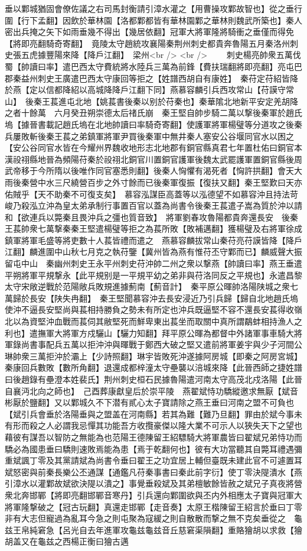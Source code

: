 垂以鄴城猶固會僚佐議之右司馬封衡請引漳水灌之【用曹操攻鄴故智也】從之垂行圍【行下孟翻】因飲於華林園【洛都鄴都皆有華林園鄴之華林則魏武所築也】秦人密出兵掩之矢下如雨垂幾不得出【幾居依翻】冠軍大將軍隆將騎衝之垂僅而得免【將即亮翻騎奇寄翻】　竟陵太守趙統攻襄陽秦荆州刺史都貴奔魯陽五月秦洛州刺史張五虎據豐陽來降【降戶江翻】　梁州<br />
<br />
　　刺史楊亮帥衆五萬伐蜀【帥讀曰率】遣巴西太守費統將水陸兵三萬為前鋒【費扶瑞翻將即亮翻】亮屯巴郡秦益州刺史王廣遣巴西太守康回等拒之【姓譜西胡自有康姓】　秦苻定苻紹皆降於燕【定以信都降紹以高城降降戶江翻下同】燕慕容麟引兵西攻常山【苻謨守常山】　後秦王萇進屯北地【姚萇書後秦以别於苻秦也】秦華隂北地新平安定羌胡降之者十餘萬　六月癸丑朔崇德太后禇氏崩　秦王堅自帥步騎二萬以撃後秦軍於趙氏塢【據晉書載記趙氏塢在北地帥讀曰率騎奇寄翻】使護軍將軍楊璧等分道攻之後秦兵屢敗斬後秦王萇之弟鎮軍將軍尹買後秦軍中無井秦人塞安公谷堰同官水以困之【安公谷同官水皆在今耀州界魏收地形志北地郡有銅官縣真君七年置杜佑曰銅官本漢祋祤縣地晉為頻陽苻秦於祋祤北銅官川置銅官護軍後魏太武罷護軍置銅官縣後周武帝移于今所隋以後唯作同官塞悉則翻】後秦人恟懼有渴死者【恟許拱翻】會天大雨後秦營中水三尺繞營百步之外寸餘而已後秦軍復振【復扶又翻】秦王堅歎曰天亦佑賊乎【天不助秦不可復支矣】　慕容泓謀臣高蓋等以泓德望不如慕容沖且持法苛峻乃殺泓立沖為皇太弟承制行事置百官以蓋為尚書令後秦王萇遣子嵩為質於沖以請和【欲連兵以斃秦且畏沖兵之彊也質音致】　將軍劉春攻魯陽都貴奔還長安　後秦王萇帥衆七萬撃秦秦王堅遣楊璧等拒之為萇所敗【敗補邁翻】獲楊璧及右將軍徐成鎮軍將軍毛盛等將吏數十人萇皆禮而遣之　燕慕容麟拔常山秦苻亮苻謨皆降【降戶江翻】麟進圍中山秋七月克之執苻鑒【冀州皆為燕有惟苻丕守鄴而已】麟威聲大振留屯中山　秦幽州刺史王永平州刺史苻沖帥二州之衆以撃燕【帥讀曰率】燕王垂遣平朔將軍平規撃永【此平規别是一平規平幼之弟非與苻洛同反之平規也】永遣昌黎太守宋敞逆戰於范陽敞兵敗規進據薊南【薊音計】　秦平原公暉帥洛陽陕城之衆七萬歸於長安【陕失冉翻】　秦王堅聞慕容沖去長安浸近乃引兵歸【歸自北地趙氏塢使沖不逼長安堅尚與萇相持勝負之勢未有所定也沖兵既逼堅不容不還長安萇得收嶺北以為資堅沖血戰而萇伺其敝堅死而鮮卑東出萇坐而取關中真所謂鷸蚌相持漁人之利也】遣撫軍大將軍方戍驪山【驪力知翻】拜平原公暉為都督中外諸軍事車騎大將軍錄尚書事配兵五萬以拒沖沖與暉戰于鄭西大破之堅又遣前將軍姜宇與少子河間公琳帥衆三萬拒沖於灞上【少詩照翻】琳宇皆敗死沖遂據阿房城【即秦之阿房宮城】　秦康回兵數敗【數所角翻】退還成都梓潼太守壘襲以涪城來降【此晉西師之捷姓譜曰後趙錄有壘澄本姓裴氏】荆州刺史桓石民據魯陽遣河南太守高茂北戍洛陽【此晉自襄沔北向之師也】　己酉葬康獻皇后於崇平陵　燕翟斌恃功驕縱邀求無厭【斌音彬厭於鹽翻】又以鄴城久不下潜有貳心太子寶請除之燕王垂曰河南之盟不可負也【斌引兵會垂於洛陽垂與之盟盖在河南縣】若其為難【難乃旦翻】罪由於斌今事未有形而殺之人必謂我忌憚其功能吾方收攬豪傑以隆大業不可示人以狹失天下之望也藉彼有謀吾以智防之無能為也范陽王德陳留王紹驃騎大將軍農皆曰翟斌兄弟恃功而驕必為國患垂曰驕則速敗焉能為患【焉于乾翻何也】彼有大功當聽其自斃耳禮遇彌重斌諷丁零及其黨請斌為尚書令垂曰翟王之功宜居上輔但臺既未建此官不可遽置耳斌怒密與前秦長樂公丕通謀【通鑑凡苻秦事書曰秦此前字衍】使丁零決隄潰水【燕引漳水以灌鄴故斌欲決隄以潰之】事覺垂殺斌及其弟檀敏餘皆赦之斌兄子真夜將營衆北奔邯鄲【將即亮翻邯鄲音寒丹】引兵還向鄴圍欲與丕内外相應太子寶與冠軍大將軍隆撃破之【冠古玩翻】真還走邯鄲【走音奏】太原王楷陳留王紹言於垂曰丁零非有大志但寵過為亂耳今急之則屯聚為寇緩之則自散散而撃之無不克矣垂從之　龜兹王帛純窘急【呂光自去年進軍攻龜兹龜兹音丘慈窘渠隕翻】重賂獪胡以求救【獪胡盖又在龜兹之西楊正衡曰獪古邁